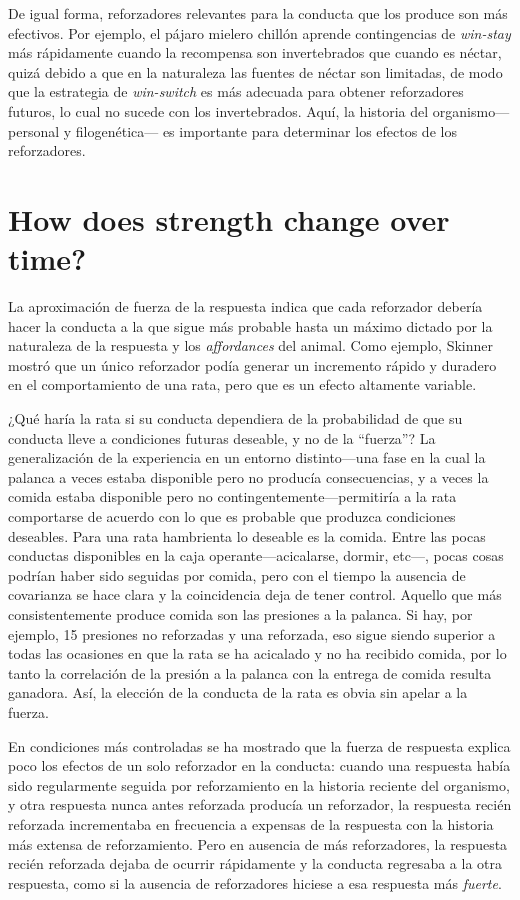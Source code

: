 \documentclass[a4paper,12pt]{article}
\begin{document}
De igual forma, reforzadores relevantes para la conducta que los produce son más efectivos. Por ejemplo, el pájaro mielero chillón aprende contingencias de {\itshape win-stay} más rápidamente cuando la recompensa son invertebrados que cuando es néctar, quizá debido a que en la naturaleza las fuentes de néctar son limitadas, de modo que la estrategia de {\itshape win-switch} es más adecuada para obtener reforzadores futuros, lo cual no sucede con los invertebrados. Aquí, la historia del organismo---personal y filogenética--- es importante para determinar los efectos de los reforzadores.

\section{How does strength change over time?}

La aproximación de fuerza de la respuesta indica que cada reforzador debería hacer la conducta a la que sigue más probable hasta un máximo dictado por la naturaleza de la respuesta y los {\itshape affordances} del animal. Como ejemplo, Skinner mostró que un único reforzador podía generar un incremento rápido y duradero en el comportamiento de una rata, pero que es un efecto altamente variable.

¿Qué haría la rata si su conducta dependiera de la probabilidad de que su conducta lleve a condiciones futuras deseable, y no de la ``fuerza''? La generalización de la experiencia en un entorno distinto---una fase en la cual la palanca a veces estaba disponible pero no producía consecuencias, y a veces la comida estaba disponible pero no contingentemente---permitiría a la rata comportarse de acuerdo con lo que es probable que produzca condiciones deseables. Para una rata hambrienta lo deseable es la comida. Entre las pocas conductas disponibles en la caja operante---acicalarse, dormir, etc---, pocas cosas podrían haber sido seguidas por comida, pero con el tiempo la ausencia de covarianza se hace clara y la coincidencia deja de tener control. Aquello que más consistentemente produce comida son las presiones a la palanca. Si hay, por ejemplo, 15 presiones no reforzadas y una reforzada, eso sigue siendo superior a todas las ocasiones en que la rata se ha acicalado y no ha recibido comida, por lo tanto la correlación de la presión a la palanca con la entrega de comida resulta ganadora. Así, la elección de la conducta de la rata es obvia sin apelar a la fuerza.

En condiciones más controladas se ha mostrado que la fuerza de respuesta explica poco los efectos de un solo reforzador en la conducta: cuando una respuesta había sido regularmente seguida por reforzamiento en la historia reciente del organismo, y otra respuesta nunca antes reforzada producía un reforzador, la respuesta recién reforzada incrementaba en frecuencia a expensas de la respuesta con la historia más extensa de reforzamiento. Pero en ausencia de más reforzadores, la respuesta recién reforzada dejaba de ocurrir rápidamente y la conducta regresaba a la otra respuesta, como si la ausencia de reforzadores hiciese a esa respuesta más {\itshape fuerte}.
\end{document}
